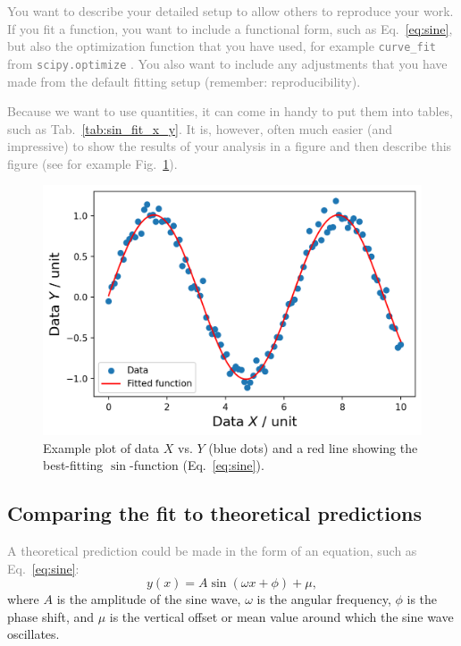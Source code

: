 \documentclass[
  journal=pasa,
  manuscript=Research-Article,
  year=2025,
  volume=X,
]{cup-journal}
\newcommand{\comment}[1]{\textcolor{gray}{#1}}
\begin{document}
\comment{You want to describe your detailed setup to allow others to reproduce your work. If you fit a function, you want to include a functional form, such as Eq.~\ref{eq:sine}, but also the optimization function that you have used, for example \texttt{curve\_fit} from \texttt{scipy.optimize} \citep{Scipy}. You also want to include any adjustments that you have made from the default fitting setup (remember: reproducibility).}

\comment{Because we want to use quantities, it can come in handy to put them into tables, such as Tab.~\ref{tab:sin_fit_x_y}. It is, however, often much easier (and impressive) to show the results of your analysis in a figure and then describe this figure (see for example Fig.~\ref{fig:sin_fit_x_y}).}



\begin{figure}
    \centering
    \includegraphics[width=\columnwidth]{figures/sin_fit_x_y.png}
    \caption{Example plot of data $X$ vs. $Y$ (blue dots) and a red line showing the best-fitting $\sin$-function (Eq.~\ref{eq:sine}).}
    \label{fig:sin_fit_x_y}
\end{figure}

\subsection{Comparing the fit to theoretical predictions} \label{sec:analysis_comparison}

\comment{A theoretical prediction could be made in the form of an equation, such as Eq.~\ref{eq:sine}:}
\begin{equation}
    y(x) = A \sin(\omega x + \phi) + \mu, \label{eq:sine}
\end{equation}
where $A$ is the amplitude of the sine wave, $\omega$ is the angular frequency, $\phi$ is the phase shift, and $\mu$ is the vertical offset or mean value around which the sine wave oscillates.
\end{document}
